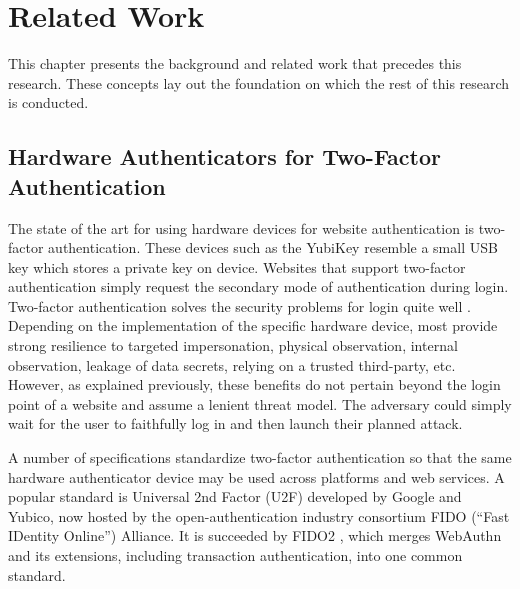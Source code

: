 \chapter{Related Work}\label{Chap:RelatedWork}

This chapter presents the background and related work that precedes this research. These concepts lay out the foundation on which the rest of this research is conducted.

\section{Hardware Authenticators for \newline Two-Factor Authentication}\label{Sec:HardwareAuthenticators_2FA}

The state of the art for using hardware devices for website authentication is two-factor authentication. These devices such as the YubiKey \cite{yubico-products} resemble a small USB key which stores a private key on device. Websites that support two-factor authentication simply request the secondary mode of authentication during login. Two-factor authentication solves the security problems for login quite well \cite{questRemovePasswords}. Depending on the implementation of the specific hardware device, most provide strong resilience to targeted impersonation, physical observation, internal observation, leakage of data secrets, relying on a trusted third-party, etc. However, as explained previously, these benefits do not pertain beyond the login point of a website and assume a lenient threat model. The adversary could simply wait for the user to faithfully log in and then launch their planned attack. 


A number of specifications standardize two-factor authentication so that the same hardware authenticator device may be used across platforms and web services. A popular standard is Universal 2nd Factor (U2F) \cite{fido-u2f} developed by Google and Yubico, now hosted by the open-authentication industry consortium FIDO (``Fast IDentity Online'') Alliance. It is succeeded by FIDO2 \cite{fido2}, which merges WebAuthn and its extensions, including transaction authentication, into one common standard.

